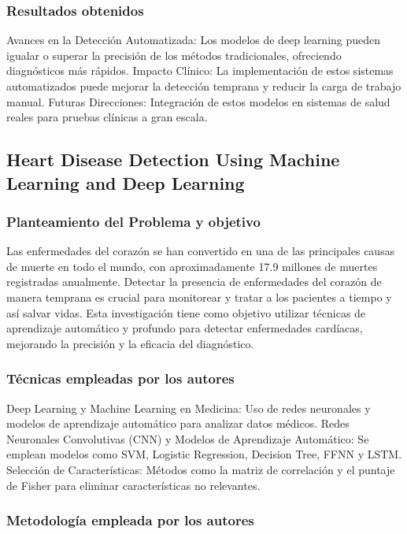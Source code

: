 \subsubsection{Resultados obtenidos}

Avances en la Detección Automatizada: Los modelos de deep learning pueden igualar o superar la precisión de los métodos tradicionales, ofreciendo diagnósticos más rápidos.
Impacto Clínico: La implementación de estos sistemas automatizados puede mejorar la detección temprana y reducir la carga de trabajo manual.
Futuras Direcciones: Integración de estos modelos en sistemas de salud reales para pruebas clínicas a gran escala.

\subsection{Heart Disease Detection Using Machine Learning and Deep Learning}

\subsubsection{Planteamiento del Problema y objetivo}

Las enfermedades del corazón se han convertido en una de las principales causas de muerte en todo el mundo, con aproximadamente 17.9 millones de muertes registradas anualmente. Detectar la presencia de enfermedades del corazón de manera temprana es crucial para monitorear y tratar a los pacientes a tiempo y así salvar vidas. Esta investigación tiene como objetivo utilizar técnicas de aprendizaje automático y profundo para detectar enfermedades cardíacas, mejorando la precisión y la eficacia del diagnóstico.

\subsubsection{Técnicas empleadas por los autores}

Deep Learning y Machine Learning en Medicina: Uso de redes neuronales y modelos de aprendizaje automático para analizar datos médicos.
Redes Neuronales Convolutivas (CNN) y Modelos de Aprendizaje Automático: Se emplean modelos como SVM, Logistic Regression, Decision Tree, FFNN y LSTM.
Selección de Características: Métodos como la matriz de correlación y el puntaje de Fisher para eliminar características no relevantes.

\subsubsection{Metodología empleada por los autores}

